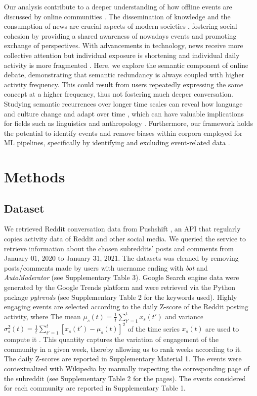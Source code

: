 \documentclass[fleqn,10pt]{wlscirep}
\begin{document}
Our analysis contribute to a deeper understanding of how offline events are discussed by online communities \cite{candia2019universal}.
The dissemination of knowledge and the consumption of news \cite{del2016spreading,gravino2022supply} are crucial aspects of modern societies \cite{watts2021measuring}, fostering social cohesion by providing a shared awareness of nowadays events and promoting exchange of perspectives.
With advancements in technology, news receive more collective attention but individual exposure is shortening \cite{lorenz2019accelerating} and individual daily activity is more fragmented \cite{sullivan2018speed}.
Here, we explore the semantic component of online debate, demonstrating that semantic redundancy is always coupled with higher activity frequency. 
This could result from users repeatedly expressing the same concept at a higher frequency, thus not fostering much deeper conversation.
Studying semantic recurrences over longer time scales can reveal how language and culture change and adapt over time \cite{nowak1999evolution,fortier2017hypermodern}, which can have valuable implications for fields such as linguistics \cite{graddol2004future} and anthropology \cite{malley2008some}. 
Furthermore, our framework holds the potential to identify events and remove biases within corpora employed for ML pipelines, specifically by identifying and excluding event-related data \cite{meade_empirical_2022}.

%
\section*{Methods}

\subsection*{Dataset}
We retrieved Reddit conversation data from Pushshift \cite{baumgartner2020pushshift}, an API that regularly copies activity data of Reddit and other social media. We queried the service to retrieve information about the chosen subreddits' posts and comments from January 01, 2020 to January 31, 2021. The datasets was cleaned by removing posts/comments made by users with username ending with \emph{bot} and \emph{AutoModerator} (see Supplementary Table 3).
%
Google Search engine data were generated by the Google Trends platform and were retrieved via the Python package \emph{pytrends} (see Supplementary Table 2 for the keywords used).
Highly engaging events are selected according to the daily Z-score of the Reddit posting activity, where The mean $\mu_s(t) = \frac{1}{t} \sum_{t' = 1}^{t} x_s(t')$ and variance $\sigma^2_s(t)=\frac{1}{t} \sum_{t' = 1}^{t} \left[ x_s(t') - \mu_s(t) \right]^2$ of the time series $x_s(t)$ are used to compute it \cite{mancini_self-induced_2022}.
This quantity captures the variation of engagement of the community in a given week, thereby allowing us to rank weeks according to it.
The daily Z-scores are reported in Supplementary Material 1.
The events were contextualized with Wikipedia by manually inspecting the corresponding page of the subreddit (see Supplementary Table 2 for the pages). The events considered for each community are reported in Supplementary Table 1.
%
\end{document}
